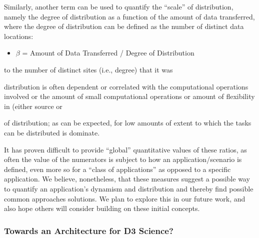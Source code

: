\documentclass[times]{cpeauth}
\begin{document}

Similarly, another term can be used to quantify the ``scale'' of distribution,
namely the degree of distribution as a function of the amount of data
transferred, where the degree of distribution can be defined as the number of
distinct data locations:

\begin{itemize}
\item[] $\beta$ = Amount of Data Transferred / Degree of Distribution
\end{itemize}

to the number of distinct sites (i.e., degree) that it was %


distribution is often dependent or correlated with the %
computational operations involved or the amount of %
small computational operations or %
amount of flexibility in %
(either source or %


of distribution; as can be expected, for low amounts of %
extent to which the tasks can be distributed is %
dominate.




It has proven difficult to provide ``global'' quantitative values of these
ratios, as often the value of the numerators is subject to how an
application/scenario is defined, even more so for a ``class of applications'' as
opposed to a specific application. We believe, nonetheless, that these measures
suggest a possible way to quantify an application's dynamism and distribution
and thereby find possible common approaches solutions.  We plan to explore this
in our future work, and also hope others will consider building on these initial
concepts.


\subsubsection{Towards an Architecture for D3 Science?}
\end{document}
